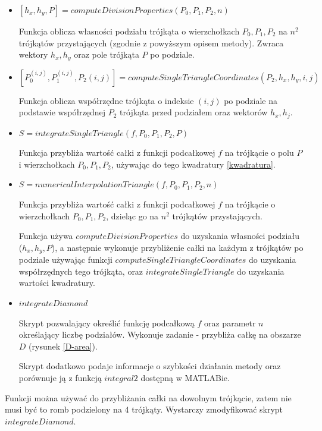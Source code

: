 \documentclass[12pt]{article}
\begin{document}
	\begin{itemize}
		\item $[h_x, h_y, P] = computeDivisionProperties(P_0, P_1, P_2, n)$
		
		Funkcja oblicza własności podziału trójkąta o wierzchołkach $P_0, P_1, P_2$ na $n^2$ trójkątów przystających (zgodnie z powyższym opisem metody). Zwraca wektory $h_x, h_y$ oraz pole trójkąta $P$ po podziale.
		
		
		\item $[P_0^{(i,j)}, P_1^{(i,j)}, P_2{(i,j)}] = computeSingleTriangleCoordinates(P_2, h_x, h_y, i, j)$
		
		Funkcja oblicza współrzędne trójkąta o indeksie $(i, j)$ po podziale na podstawie współrzędnej $P_2$ trójkąta przed podziałem oraz wektorów $h_x, h_j$.
		
		
		\item $S = integrateSingleTriangle(f, P_0, P_1, P_2, P)$
		
		Funkcja przybliża wartość całki z funkcji podcałkowej $f$ na trójkącie o polu $P$ i wierzchołkach $P_0, P_1, P_2$, używając do tego kwadratury \eqref{kwadratura}.
		
		
		\item $S = numericalInterpolationTriangle(f, P_0, P_1, P_2, n)$
		
		Funkcja przybliża wartość całki z funkcji podcałkowej $f$ na trójkącie o wierzchołkach $P_0, P_1, P_2$, dzieląc go na $n^2$ trójkątów przystających.
		
		Funkcja używa $computeDivisionProperties$ do uzyskania własności podziału ($h_x, h_y, P$), a następnie wykonuje przybliżenie całki na każdym z trójkątów po podziale używając funkcji $computeSingleTriangleCoordinates$ do uzyskania współrzędnych tego trójkąta, oraz $integrateSingleTriangle$ do uzyskania wartości kwadratury.
		
		\item $integrateDiamond$
		
		Skrypt pozwalający określić funkcję podcałkową $f$ oraz parametr $n$ określający liczbę podziałów. Wykonuje zadanie - przybliża całkę na obszarze $D$ (rysunek \ref{D-area}).
		
		Skrypt dodatkowo podaje informacje o szybkości działania metody oraz porównuje ją z funkcją $integral2$ dostępną w MATLABie.
	\end{itemize}

	Funkcji można używać do przybliżania całki na dowolnym trójkącie, zatem nie musi być to romb podzielony na 4 trójkąty. Wystarczy zmodyfikować skrypt $integrateDiamond$.
	
\end{document}
